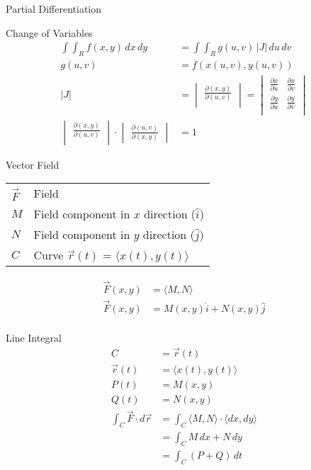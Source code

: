\begin{section}{Partial Differentiation}
  \begin{section}{Change of Variables}
    \begin{align*}
      \int\int_R{f(x,y) \,dx \,dy} &=\int\int_R{g(u,v)\, |J| \,du \,dv} \\
      g(u,v) &= f(x(u,v),y(u,v)) \\
      |J| &=
            \begin{vmatrix}
              \frac{\partial{(x,y)}}{\partial{(u,v)}}\\
            \end{vmatrix} =
      \begin{vmatrix}
        \frac{\partial{x}}{\partial{u}} & \frac{\partial{x}}{\partial{v}}\\
        \frac{\partial{y}}{\partial{u}} & \frac{\partial{y}}{\partial{v}}\\
      \end{vmatrix} \\
      \begin{vmatrix}
        \frac{\partial{(x,y)}}{\partial{(u,v)}}\\
      \end{vmatrix}
      \cdot
      \begin{vmatrix}
        \frac{\partial{(u,v)}}{\partial{(x,y)}}
      \end{vmatrix}
      &= 1
    \end{align*}
  \end{section}

  \begin{section}{Vector Field}
    \begin{tabular}{l l}
     $\vec{F}$ & Field \\
     $M$ & Field component in $x$ direction ($\hat{i}$)\\
     $N$ & Field component in $y$ direction ($\hat{j}$)\\
     $C$ & Curve $\vec{r}(t)$ = $ \langle x(t),y(t) \rangle $\\
   \end{tabular}
    \begin{align*}
     \vec{F}(x,y) &= \langle M,N \rangle \\
     \vec{F}(x,y) &= M(x,y)\hat{i} + N(x,y)\hat{j}\\
    \end{align*}
  \end{section}

  \begin{section}{Line Integral}
    \begin{align*}
      C &=\vec{r}(t) \\
      \vec{r}(t) &=\langle x(t),y(t) \rangle  \\
      P(t) &= M(x,y) \\
      Q(t) &= N(x,y) \\
      \int_C \vec{F} \cdot d\vec{r} &= \int_C \langle M,N \rangle \cdot \langle dx,dy \rangle \\
       &= \int_C M\,dx + N\,dy \\
       &= \int_C (P + Q) \,dt \\
    \end{align*}
  \end{section}


\end{section}
